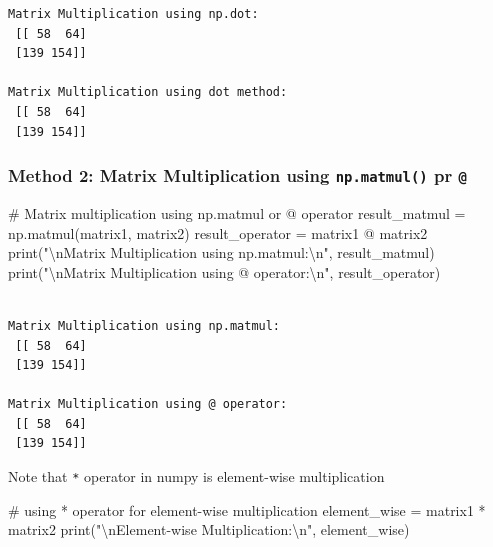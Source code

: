 \documentclass[
  letterpaper,
  DIV=11,
  numbers=noendperiod]{scrreprt}
\newenvironment{Shaded}{\begin{snugshade}}{\end{snugshade}}
\newcommand{\BuiltInTok}[1]{\textcolor[rgb]{0.00,0.23,0.31}{#1}}
\newcommand{\CharTok}[1]{\textcolor[rgb]{0.13,0.47,0.30}{#1}}
\newcommand{\CommentTok}[1]{\textcolor[rgb]{0.37,0.37,0.37}{#1}}
\newcommand{\NormalTok}[1]{\textcolor[rgb]{0.00,0.23,0.31}{#1}}
\newcommand{\OperatorTok}[1]{\textcolor[rgb]{0.37,0.37,0.37}{#1}}
\newcommand{\StringTok}[1]{\textcolor[rgb]{0.13,0.47,0.30}{#1}}
\begin{document}
\begin{verbatim}
Matrix Multiplication using np.dot:
 [[ 58  64]
 [139 154]]

Matrix Multiplication using dot method:
 [[ 58  64]
 [139 154]]
\end{verbatim}

\hypertarget{method-2-matrix-multiplication-using-np.matmul-pr}{%
\subsubsection{\texorpdfstring{Method 2: Matrix Multiplication using
\texttt{np.matmul()} pr
\texttt{@}}{Method 2: Matrix Multiplication using np.matmul() pr @}}\label{method-2-matrix-multiplication-using-np.matmul-pr}}

\begin{Shaded}
\begin{Highlighting}[]
\CommentTok{\# Matrix multiplication using np.matmul or @ operator}
\NormalTok{result\_matmul }\OperatorTok{=}\NormalTok{ np.matmul(matrix1, matrix2)}
\NormalTok{result\_operator }\OperatorTok{=}\NormalTok{ matrix1 }\OperatorTok{@}\NormalTok{ matrix2}
\BuiltInTok{print}\NormalTok{(}\StringTok{"}\CharTok{\textbackslash{}n}\StringTok{Matrix Multiplication using np.matmul:}\CharTok{\textbackslash{}n}\StringTok{"}\NormalTok{, result\_matmul)}
\BuiltInTok{print}\NormalTok{(}\StringTok{"}\CharTok{\textbackslash{}n}\StringTok{Matrix Multiplication using @ operator:}\CharTok{\textbackslash{}n}\StringTok{"}\NormalTok{, result\_operator)}
\end{Highlighting}
\end{Shaded}

\begin{verbatim}

Matrix Multiplication using np.matmul:
 [[ 58  64]
 [139 154]]

Matrix Multiplication using @ operator:
 [[ 58  64]
 [139 154]]
\end{verbatim}

Note that \texttt{*} operator in numpy is element-wise multiplication

\begin{Shaded}
\begin{Highlighting}[]
\CommentTok{\# using * operator for element{-}wise multiplication}
\NormalTok{element\_wise }\OperatorTok{=}\NormalTok{ matrix1 }\OperatorTok{*}\NormalTok{ matrix2}
\BuiltInTok{print}\NormalTok{(}\StringTok{"}\CharTok{\textbackslash{}n}\StringTok{Element{-}wise Multiplication:}\CharTok{\textbackslash{}n}\StringTok{"}\NormalTok{, element\_wise)}
\end{Highlighting}
\end{Shaded}
\end{document}
